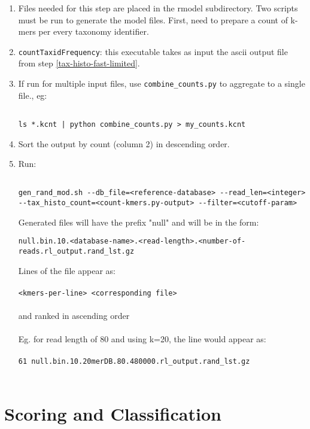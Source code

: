 \documentclass[11pt]{article}
\begin{document}
\begin{enumerate}
\item
Files needed for this step are placed in the rmodel subdirectory.  Two
scripts must be run to generate the model files. First, need to
prepare a count of k-mers per every taxonomy identifier.
\item
\texttt{countTaxidFrequency}: this executable takes as input the ascii output file from step \ref{tax-histo-fast-limited}. 
\item

If run for multiple input files, use \texttt{combine\_counts.py} to aggregate to a single file., eg:
\begin{verbatim}

ls *.kcnt | python combine_counts.py > my_counts.kcnt
\end{verbatim}
\item
Sort the output by count (column 2) in descending order.
\item 
Run:
\begin{verbatim}

gen_rand_mod.sh --db_file=<reference-database> --read_len=<integer> --tax_histo_count=<count-kmers.py-output> --filter=<cutoff-param>
\end{verbatim}

Generated files will have the prefix "null" and will be in the form:

\texttt{null.bin.10.<database-name>.<read-length>.<number-of-reads.rl\_output.rand\_lst.gz}

Lines of the file appear as:\\
\\
\texttt{<kmers-per-line> <corresponding file>}\\
\\
 and ranked in ascending order\\
\\
Eg. for read length of 80 and using k=20, the line would appear as:\\
\\
\texttt{61 null.bin.10.20merDB.80.480000.rl\_output.rand\_lst.gz}\\
\\
\end{enumerate}

\section{Scoring and Classification}
\label{sec:scoring}
\end{document}

